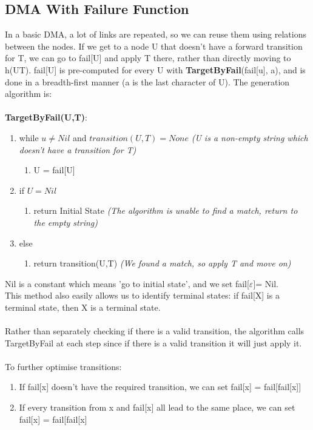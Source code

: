 \subsection{DMA With Failure Function}
In a basic DMA, a lot of links are repeated, so we can reuse them using relations between the nodes. If we get to a node U that doesn't have a forward transition for T, we can go to fail[U] and apply T there, rather than directly moving to h(UT). fail[U] is pre-computed for every U with \textbf{TargetByFail}(fail[u], a), and is done in a breadth-first manner (a is the last character of U). The generation algorithm is: \\ \\
\textbf{TargetByFail(U,T)}:
\begin{enumerate}[label=\Alph*]
    \item while $u \neq Nil$ and $transition(U,T) = None$ \emph{(U is a non-empty string which doesn't have a transition for T)}
\begin{enumerate}[label=\arabic*]
    \item [] U = fail[U]
\end{enumerate}    
    \item if $U = Nil$
 \begin{enumerate}[label=\arabic*]
    \item [] return Initial State \emph{(The algorithm is unable to find a match, return to the empty string)}
\end{enumerate} 
    \item [] else
 \begin{enumerate}[label=\arabic*]
    \item [] return transition(U,T) \emph{(We found a match, so apply T and move on)}
\end{enumerate} 
\end{enumerate}
Nil is a constant which means 'go to initial state', and we set fail[$\varepsilon$]= Nil. \\  This method also easily allows us to identify terminal states: if fail[X] is a terminal state, then X is a terminal state. \\ \\ Rather than separately checking if there is a valid transition, the algorithm calls \\ TargetByFail at each step since if there is a valid transition it will just apply it.\\ \\
To further optimise transitions:
\begin{enumerate}
    \item If fail[x] doesn't have the required transition, we can set fail[x] = fail[fail[x]]
    \item If every transition from x and fail[x] all lead to the same place, we can set fail[x] = fail[fail[x]
\end{enumerate}





